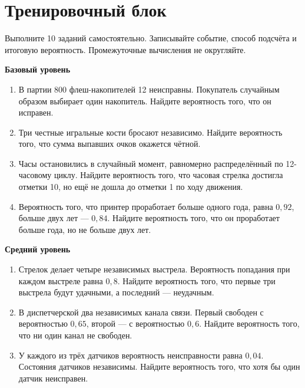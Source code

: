 \documentclass[a4paper,12pt]{article}
\begin{document}
\section*{Тренировочный блок}
Выполните 10 заданий самостоятельно. Записывайте событие, способ подсчёта и итоговую вероятность. Промежуточные вычисления не округляйте.

\textcolor{darkaccent}{\textbf{Базовый уровень}}
\begin{enumerate}
\item В партии 800 флеш-накопителей 12 неисправны. Покупатель случайным образом выбирает один накопитель. Найдите вероятность того, что он исправен.
\item Три честные игральные кости бросают независимо. Найдите вероятность того, что сумма выпавших очков окажется чётной.
\item Часы остановились в случайный момент, равномерно распределённый по 12-часовому циклу. Найдите вероятность того, что часовая стрелка достигла отметки 10, но ещё не дошла до отметки 1 по ходу движения.
\item Вероятность того, что принтер проработает больше одного года, равна $0,92$, больше двух лет — $0,84$. Найдите вероятность того, что он проработает больше года, но не больше двух лет.
\end{enumerate}

\textcolor{darkaccent}{\textbf{Средний уровень}}
\begin{enumerate}[start=5]
\item Стрелок делает четыре независимых выстрела. Вероятность попадания при каждом выстреле равна $0,8$. Найдите вероятность того, что первые три выстрела будут удачными, а последний — неудачным.
\item В диспетчерской два независимых канала связи. Первый свободен с вероятностью $0,65$, второй — с вероятностью $0,6$. Найдите вероятность того, что ни один канал не свободен.
\item У каждого из трёх датчиков вероятность неисправности равна $0,04$. Состояния датчиков независимы. Найдите вероятность того, что хотя бы один датчик неисправен.
\end{enumerate}

\clearpage
\end{document}
